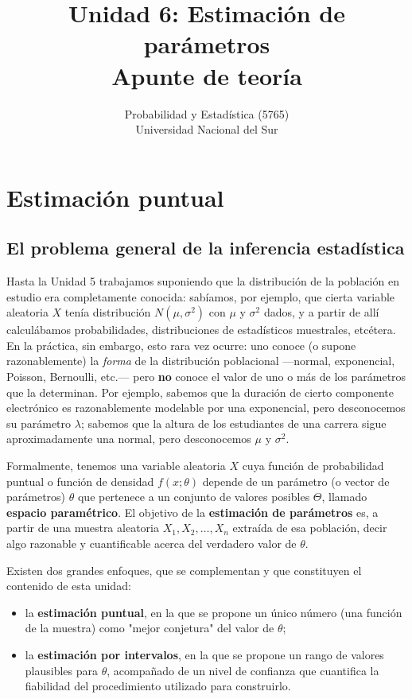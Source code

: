 \documentclass[11pt,a4paper]{article}
\title{Unidad 6: Estimación de parámetros \\ \large Apunte de teoría}
\author{Probabilidad y Estadística (5765) \\ Universidad Nacional del Sur}
\date{}
\theoremstyle{plain}
\theoremstyle{definition}
\theoremstyle{remark}
\begin{document}
\maketitle
\tableofcontents
\newpage

\section{Estimación puntual}

\subsection{El problema general de la inferencia estadística}

Hasta la Unidad 5 trabajamos suponiendo que la distribución de la población en estudio era completamente conocida: sabíamos, por ejemplo, que cierta variable aleatoria $X$ tenía distribución $N(\mu,\sigma^2)$ con $\mu$ y $\sigma^2$ dados, y a partir de allí calculábamos probabilidades, distribuciones de estadísticos muestrales, etcétera. En la práctica, sin embargo, esto rara vez ocurre: uno conoce (o supone razonablemente) la \emph{forma} de la distribución poblacional —normal, exponencial, Poisson, Bernoulli, etc.— pero \textbf{no} conoce el valor de uno o más de los parámetros que la determinan. Por ejemplo, sabemos que la duración de cierto componente electrónico es razonablemente modelable por una exponencial, pero desconocemos su parámetro $\lambda$; sabemos que la altura de los estudiantes de una carrera sigue aproximadamente una normal, pero desconocemos $\mu$ y $\sigma^2$.

Formalmente, tenemos una variable aleatoria $X$ cuya función de probabilidad puntual o función de densidad $f(x;\theta)$ depende de un parámetro (o vector de parámetros) $\theta$ que pertenece a un conjunto de valores posibles $\Theta$, llamado \textbf{espacio paramétrico}. El objetivo de la \textbf{estimación de parámetros} es, a partir de una muestra aleatoria $X_1, X_2, \dots, X_n$ extraída de esa población, decir algo razonable y cuantificable acerca del verdadero valor de $\theta$.

Existen dos grandes enfoques, que se complementan y que constituyen el contenido de esta unidad:

\begin{itemize}[leftmargin=1.3cm]
\item la \textbf{estimación puntual}, en la que se propone un único número (una función de la muestra) como "mejor conjetura" del valor de $\theta$;
\item la \textbf{estimación por intervalos}, en la que se propone un rango de valores plausibles para $\theta$, acompañado de un nivel de confianza que cuantifica la fiabilidad del procedimiento utilizado para construirlo.
\end{itemize}
\end{document}
